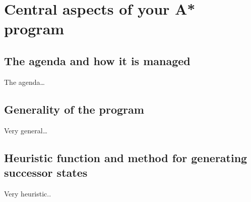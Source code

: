 \section{Central aspects of your A* program}
\subsection{The agenda and how it is managed}
The agenda\ldots

\subsection{Generality of the program}



Very general\ldots



\subsection{Heuristic function and method for generating successor states}
Very heuristic..
